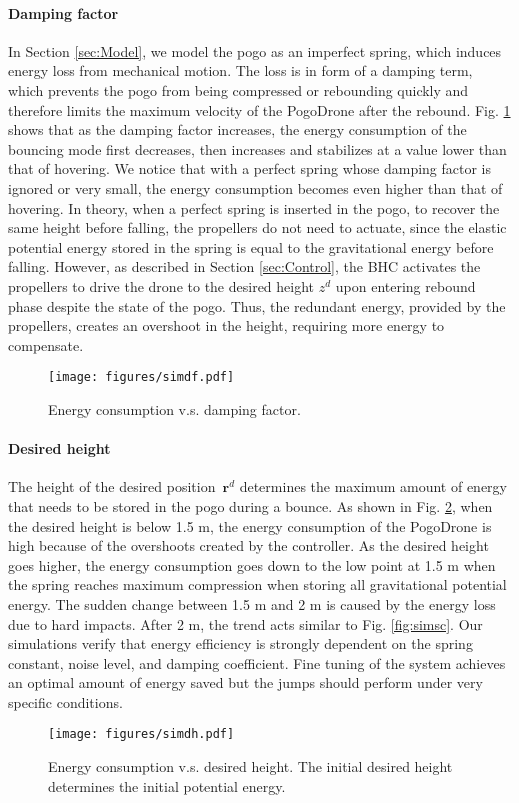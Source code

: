 \documentclass[letterpaper,10pt,conference]{ieeeconf}
\begin{document}
{\paragraph{Damping factor}{
In Section \ref{sec:Model}, we model the pogo as an imperfect spring, which induces energy loss from mechanical motion. The loss is in form of a damping term, which prevents the pogo from being compressed or rebounding quickly and therefore limits the maximum velocity of the PogoDrone after the rebound. 
%
Fig. \ref{fig:simdf} shows that as the damping factor increases, the energy consumption of the bouncing mode first decreases, then increases and stabilizes at a value lower than that of hovering. We notice that with a perfect spring whose damping factor is ignored or very small, the energy consumption becomes even higher than that of hovering. In theory, when a perfect spring is inserted in the pogo, to recover the same height before falling, the propellers do not need to actuate, since the elastic potential energy stored in the spring is equal to the gravitational energy before falling. However, as described in Section \ref{sec:Control}, the BHC activates the propellers to drive the drone to the desired height $z^d$ upon entering rebound phase despite the state of the pogo. Thus, the redundant energy, provided by the propellers, creates an overshoot in the height, requiring more energy to compensate. 

\begin{figure}[t!]
    \texttt{[image: figures/simdf.pdf]}
    \caption{Energy consumption v.s. damping factor.}
    \label{fig:simdf}
\end{figure}
}

\noindent
\paragraph{Desired height}{
The height of the desired position~$\boldsymbol{r}^d$ determines the maximum amount of energy that needs to be stored in the pogo during a bounce. 
%
As shown in Fig. \ref{fig:simdh}, when the desired height is below 1.5 m, the energy consumption of the PogoDrone is high because of the overshoots created by the controller. As the desired height goes higher, the energy consumption goes down to the low point at 1.5 m when the spring reaches maximum compression when storing all gravitational potential energy. The sudden change between 1.5 m and 2 m is caused by the energy loss due to hard impacts. After 2 m, the trend acts similar to Fig. \ref{fig:simsc}.
%
{Our simulations verify that energy efficiency is strongly dependent on the spring constant, noise level, and damping coefficient. Fine tuning of the system achieves an optimal amount of energy saved but the jumps should perform under very specific conditions.
}

\begin{figure}[t!]
    \texttt{[image: figures/simdh.pdf]}
    \caption{Energy consumption v.s. desired height. The initial desired height determines the initial potential energy.}
    \label{fig:simdh}
\end{figure}
}

}
\end{document}
